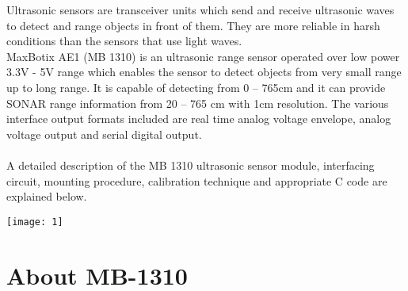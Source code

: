 \documentclass[a4paper,29.6pt]{article}
\begin{document}
\begin{large}
\hspace{.5in}Ultrasonic sensors are transceiver units which send and receive ultrasonic waves to detect and range objects in front of them. They are more reliable in harsh conditions than the sensors that use light waves. \\

MaxBotix AE1 (MB 1310) is an ultrasonic range sensor operated over low power 3.3V - 5V range which enables the sensor to detect objects from very small range up to long range. It is capable of detecting from 0 – 765cm and it can provide SONAR range information from 20 – 765 cm with 1cm resolution. The various interface output formats included are real time analog voltage envelope, analog voltage output and serial digital output.  
\\\\
A detailed description of the MB 1310 ultrasonic sensor module, interfacing circuit, mounting procedure, calibration technique and appropriate C code are explained below.\\

\end{large}
\begin{center}
\texttt{[image: 1]}
\end{center}


\newpage
\section{About MB-1310}
\end{document}
